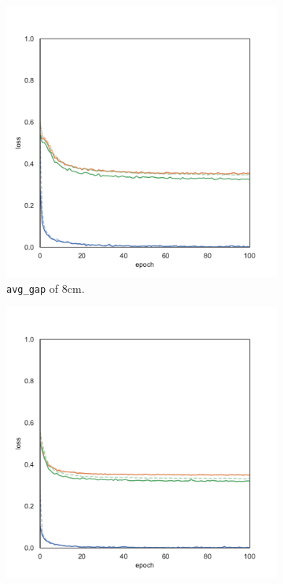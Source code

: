 \begin{figure}[!htb]
	\begin{center}
		\begin{subfigure}[h]{0.32\textwidth}
			\includegraphics[width=\textwidth]{contents/images/task2/loss-communication-gap_8}%
			\caption{\texttt{avg\_gap} of $8$\gls{cm}.}
		\end{subfigure}
		\hfill
		\begin{subfigure}[h]{0.32\textwidth}
			\includegraphics[width=\textwidth]{contents/images/task2/loss-communication-gap_20}%

\end{subfigure}
\end{center}
\end{figure}
